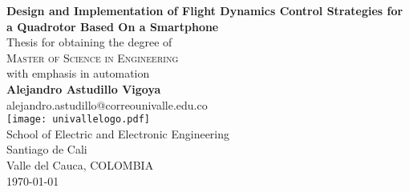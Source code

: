 \begin{titlepage}
\begin{center}
 {\LARGE\bfseries Design and Implementation of Flight Dynamics Control Strategies for a Quadrotor Based On a Smartphone\\}
 \vspace{2.5cm}
{Thesis for obtaining the degree of} \\[2cm]
\textsc{\Large{{Master of Science in Engineering}}} \\[5pt]
{with emphasis in automation} \\[2pt]
 \vfill
 \vspace{0.5cm}
 \vspace{1.5cm}
 {\Large\bfseries Alejandro Astudillo Vigoya}\\[5pt]
 alejandro.astudillo@correounivalle.edu.co\\[14pt]
 \vspace{1.5cm}
\texttt{[image: univallelogo.pdf]}\\[5pt]
{School of Electric and Electronic Engineering}\\[5pt]
{Santiago de Cali}\\[5pt]
{Valle del Cauca,
 COLOMBIA}\\
 \vfill
 \vspace{0.2cm}
{\today} %
\end{center}
\end{titlepage}